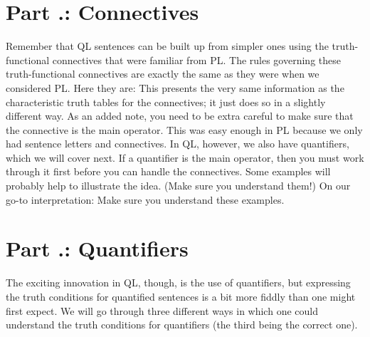 \section{Part \thechapcount.\theseccount: Connectives}
Remember that QL sentences can be built up from simpler ones using the truth-functional connectives that were familiar from PL. The rules governing these truth-functional connectives are exactly the same as they were when we considered PL. Here they are:
This presents the very same information as the characteristic truth tables for the connectives; it just does so in a slightly different way. As an added note, you need to be extra careful to make sure that the connective is the main operator. This was easy enough in PL because we only had sentence letters and connectives. In QL, however, we also have quantifiers, which we will cover next. If a quantifier is the main operator, then you must work through it first before you can handle the connectives. Some examples will probably help to illustrate the idea. (Make sure you understand them!) On our go-to interpretation:
Make sure you understand these examples.
\section{Part \thechapcount.\theseccount: Quantifiers}
The exciting innovation in QL, though, is the use of quantifiers, but expressing the truth conditions for quantified sentences is a bit more fiddly than one might first expect. We will go through three different ways in which one could understand the truth conditions for quantifiers (the third being the correct one). 


